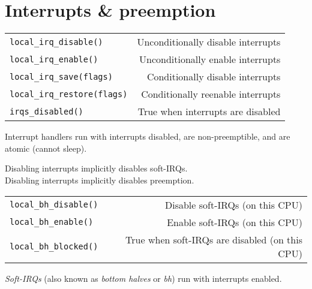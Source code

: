 %

\section{Interrupts \& preemption}

\begin{header}
\begin{tabularx}{\linewidth}{@{}lR@{}}
\texttt{local\_irq\_disable()} & Unconditionally disable interrupts \\
\texttt{local\_irq\_enable()} & Unconditionally enable interrupts \\
\texttt{local\_irq\_save(flags)} & Conditionally disable interrupts \\
\texttt{local\_irq\_restore(flags)} & Conditionally reenable interrupts \\
\hline
\texttt{irqs\_disabled()} & True when interrupts are disabled \\
\end{tabularx}

Interrupt handlers run with interrupts disabled, are non-preemptible, and are atomic (cannot sleep).

Disabling interrupts implicitly disables soft-IRQs. \\
Disabling interrupts implicitly disables preemption.
\end{header}

\begin{header}
\begin{tabularx}{\linewidth}{@{}lR@{}}
\texttt{local\_bh\_disable()} & Disable soft-IRQs (on this CPU) \\
\texttt{local\_bh\_enable()} & Enable soft-IRQs (on this CPU) \\
\texttt{local\_bh\_blocked()} & True when soft-IRQs are disabled (on this CPU) \\
\end{tabularx}

\emph{Soft-IRQs} (also known as \emph{bottom halves} or \emph{bh}) run with interrupts enabled.
\end{header}


